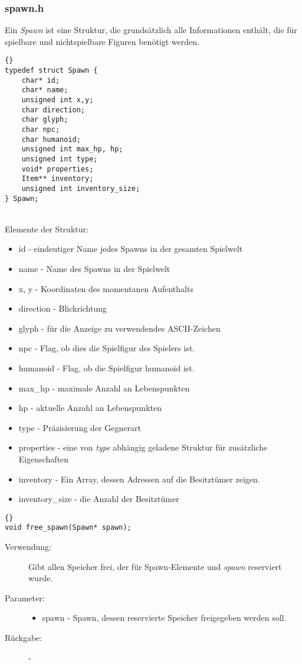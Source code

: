 \documentclass[11pt,a4paper,notitlepage]{report}
\begin{document}
	\subsubsection*{spawn.h}
	Ein \textit{Spawn} ist eine Struktur, die grundsätzlich alle Informationen enthält, die für spielbare und nichtspielbare Figuren benötigt werden.
	\begin{lstlisting}[caption=Spawn]{}
typedef struct Spawn {
	char* id;
	char* name;
	unsigned int x,y;
	char direction;
	char glyph;
	char npc;
	char humanoid;
	unsigned int max_hp, hp;
	unsigned int type;
	void* properties;
	Item** inventory;
	unsigned int inventory_size;
} Spawn;
		\end{lstlisting} \hspace*{\fill} \\
Elemente der Struktur:
		\begin{itemize}
			\item id - eindeutiger Name jedes Spawns in der gesamten Spielwelt
			\item name - Name des Spawns in der Spielwelt
			\item x, y - Koordinaten des momentanen Aufenthalts
			\item direction - Blickrichtung
			\item glyph - für die Anzeige zu verwendendes ASCII-Zeichen
			\item npc - Flag, ob dies die Spielfigur des Spielers ist.
			\item humanoid - Flag, ob die Spielfigur humanoid ist.
			\item max\_hp - maximale Anzahl an Lebenspunkten
			\item hp - aktuelle Anzahl an Lebenspunkten
			\item type - Präzisierung der Gegnerart
			\item properties - eine von \textit{type} abhängig geladene Struktur für zusätzliche Eigenschaften
			\item inventory - Ein Array, dessen Adressen auf die Besitztümer zeigen.
			\item inventory\_size - die Anzahl der Besitztümer
		\end{itemize}
		
		\begin{lstlisting}[caption=free\_spawn]{}
void free_spawn(Spawn* spawn);
		\end{lstlisting}
		
	\begin{description}
		\item[Verwendung:] Gibt allen Speicher frei, der für Spawn-Elemente und \textit{spawn} reserviert wurde.
		\item[Parameter:] \hfill
		\begin{itemize}
			\item spawn - Spawn, dessen reservierte Speicher freigegeben werden soll.
		\end{itemize}
		\item[Rückgabe:] -
	\end{description}
	
\end{document}

